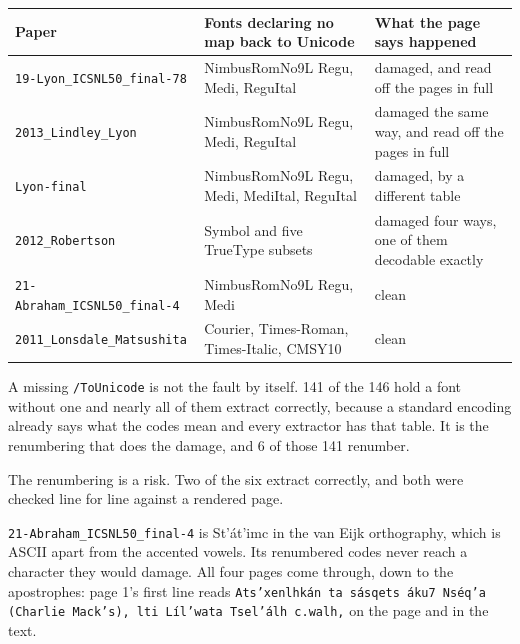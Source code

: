 \tiny
\setlength{\tabcolsep}{2pt}
\begin{longtable}{@{}>{\raggedright\arraybackslash}p{}>{\raggedright\arraybackslash}p{}>{\raggedright\arraybackslash}p{}@{}}
\toprule
Paper & Fonts declaring no map back to Unicode & What the page says happened \\
\midrule
\texttt{19-\allowbreak{}Lyon\_\allowbreak{}ICSNL50\_\allowbreak{}final-\allowbreak{}78} & NimbusRomNo9L Regu, Medi, ReguItal & damaged, and read off the pages in full \\
\texttt{2013\_\allowbreak{}Lindley\_\allowbreak{}Lyon} & NimbusRomNo9L Regu, Medi, ReguItal & damaged the same way, and read off the pages in full \\
\texttt{Lyon-\allowbreak{}final} & NimbusRomNo9L Regu, Medi, MediItal, ReguItal & damaged, by a different table \\
\texttt{2012\_\allowbreak{}Robertson} & Symbol and five TrueType subsets & damaged four ways, one of them decodable exactly \\
\texttt{21-\allowbreak{}Abraham\_\allowbreak{}ICSNL50\_\allowbreak{}final-\allowbreak{}4} & NimbusRomNo9L Regu, Medi & clean \\
\texttt{2011\_\allowbreak{}Lonsdale\_\allowbreak{}Matsushita} & Courier, Times-Roman, Times-Italic, CMSY10 & clean \\
\bottomrule
\end{longtable}
\normalsize

A missing \texttt{/\allowbreak{}To\allowbreak{}Unicode} is not the fault by itself. 141 of the 146 hold a font without one and nearly all of them extract correctly, because a standard encoding already says what the codes mean and every extractor has that table. It is the renumbering that does the damage, and 6 of those 141 renumber.

The renumbering is a risk. Two of the six extract correctly, and both were checked line for line against a rendered page.

\texttt{21-\allowbreak{}Abraham\_\allowbreak{}ICSNL50\_\allowbreak{}final-\allowbreak{}4} is St'át'imc in the van Eijk orthography, which is ASCII apart from the accented vowels. Its renumbered codes never reach a character they would damage. All four pages come through, down to the apostrophes: page 1's first line reads \texttt{Ats’xenlhkán ta sásqets áku7 Nséq’a (Charlie Mack’s), lti Líl’wata Tsel’álh c.\allowbreak{}walh,} on the page and in the text.

